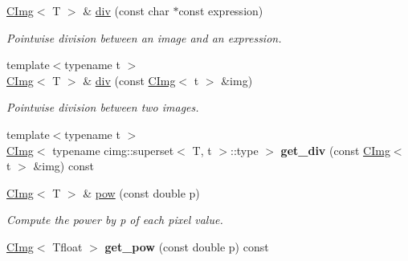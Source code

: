 \begin{DoxyCompactItemize}
\item 
\hypertarget{structcimg__library_1_1CImg_a187fef59178f8dc9afe628944195fd29}{
\hyperlink{structcimg__library_1_1CImg}{CImg}$<$ T $>$ \& \hyperlink{structcimg__library_1_1CImg_a187fef59178f8dc9afe628944195fd29}{div} (const char $\ast$const expression)}
\label{structcimg__library_1_1CImg_a187fef59178f8dc9afe628944195fd29}

\begin{DoxyCompactList}\small\item\em Pointwise division between an image and an expression. \item\end{DoxyCompactList}\item 
\hypertarget{structcimg__library_1_1CImg_adf1a8f5e809741e70edd3b6a454c8689}{
{\footnotesize template$<$typename t $>$ }\\\hyperlink{structcimg__library_1_1CImg}{CImg}$<$ T $>$ \& \hyperlink{structcimg__library_1_1CImg_adf1a8f5e809741e70edd3b6a454c8689}{div} (const \hyperlink{structcimg__library_1_1CImg}{CImg}$<$ t $>$ \&img)}
\label{structcimg__library_1_1CImg_adf1a8f5e809741e70edd3b6a454c8689}

\begin{DoxyCompactList}\small\item\em Pointwise division between two images. \item\end{DoxyCompactList}\item 
\hypertarget{structcimg__library_1_1CImg_a477d1fcd913a77dd97c58637c7d14451}{
{\footnotesize template$<$typename t $>$ }\\\hyperlink{structcimg__library_1_1CImg}{CImg}$<$ typename cimg::superset$<$ T, t $>$::type $>$ {\bfseries get\_\-div} (const \hyperlink{structcimg__library_1_1CImg}{CImg}$<$ t $>$ \&img) const }
\label{structcimg__library_1_1CImg_a477d1fcd913a77dd97c58637c7d14451}

\item 
\hypertarget{structcimg__library_1_1CImg_ae2f27aee992cf2189c56fdbaaf72ef76}{
\hyperlink{structcimg__library_1_1CImg}{CImg}$<$ T $>$ \& \hyperlink{structcimg__library_1_1CImg_ae2f27aee992cf2189c56fdbaaf72ef76}{pow} (const double p)}
\label{structcimg__library_1_1CImg_ae2f27aee992cf2189c56fdbaaf72ef76}

\begin{DoxyCompactList}\small\item\em Compute the power by p of each pixel value. \item\end{DoxyCompactList}\item 
\hypertarget{structcimg__library_1_1CImg_add8d4f2be601a42c61217a6d0bf7576b}{
\hyperlink{structcimg__library_1_1CImg}{CImg}$<$ Tfloat $>$ {\bfseries get\_\-pow} (const double p) const }
\label{structcimg__library_1_1CImg_add8d4f2be601a42c61217a6d0bf7576b}


\end{DoxyCompactItemize}

